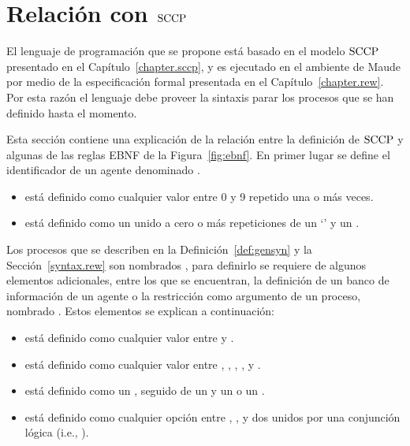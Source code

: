 \section{Relaci\'on con $\textnormal{SCCP}$}
\label{sccp.lang}

El lenguaje de programaci\'on que se propone est\'a basado en el modelo $\textnormal{SCCP}$ presentado en el Cap\'itulo~\ref{chapter.sccp}, y es ejecutado en el ambiente de Maude por medio de la especificaci\'on formal presentada en el Cap\'itulo~\ref{chapter.rew}. Por esta raz\'on el lenguaje debe proveer la sintaxis parar los procesos que se han definido hasta el momento. 

Esta secci\'on contiene una explicaci\'on de la relaci\'on entre la definici\'on de $\textnormal{SCCP}$ y algunas de las reglas EBNF de la Figura~\ref{fig:ebnf}. En primer lugar se define el identificador de un agente denominado .

\begin{itemize}
\item {} est\'a definido como cualquier valor entre 0 y 9 repetido una o m\'as veces.
\item {} est\'a definido como un  unido a cero o m\'as repeticiones de un `' y un .
\end{itemize}

Los procesos que se describen en la Definici\'on~\ref{def:gensyn} y la Secci\'on~\ref{syntax.rew} son nombrados , para definirlo se requiere de algunos elementos adicionales, entre los que se encuentran, la definici\'on de un banco de informaci\'on de un agente o la restricci\'on como argumento de un proceso, nombrado . Estos elementos se explican a continuaci\'on:

\begin{itemize}
\item {} est\'a definido como cualquier valor entre  y .
\item {} est\'a definido como cualquier valor entre \textterm{>}, \textterm{<}, \textterm{=}, \textterm{=/=}, \textterm{>=} y \textterm{<=}.
\item {} est\'a definido como un , seguido de un  y un  o un . 
\item {} est\'a definido como cualquier opci\'on entre , ,  y dos  unidos por una conjunci\'on l\'ogica (i.e., ).
\end{itemize}

